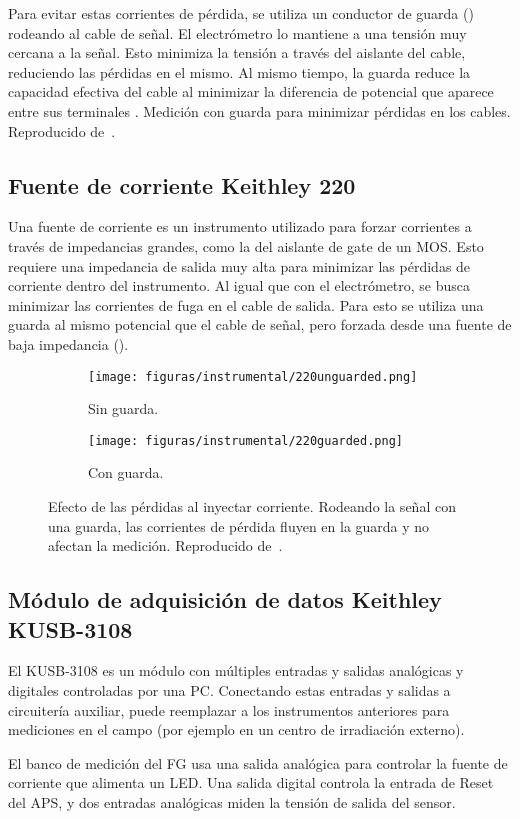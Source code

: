 Para evitar estas corrientes de pérdida,
se utiliza un conductor de guarda ()
rodeando al cable de señal.
El electrómetro lo mantiene a una tensión muy cercana a la señal.
Esto minimiza la tensión a través del aislante del cable,
reduciendo las pérdidas en el mismo.
Al mismo tiempo, la guarda reduce la capacidad efectiva del cable
al minimizar la diferencia de potencial que aparece entre sus terminales
\cite{rich_shielding_1983}.
{Medición con guarda para minimizar pérdidas en los cables.
    Reproducido de~\cite{keithley_instruments_inc._keithley_1984}.}
\subsection{Fuente de corriente Keithley 220}
Una fuente de corriente es un instrumento utilizado para forzar corrientes a
través de impedancias grandes,
como la del aislante de gate de un MOS.
Esto requiere una impedancia de salida muy alta para minimizar las pérdidas de
corriente dentro del instrumento.
Al igual que con el electrómetro,
se busca minimizar las corrientes de fuga en el cable de salida.
Para esto se utiliza una guarda al mismo potencial que el cable de señal,
pero forzada desde una fuente de baja impedancia ().
\begin{figure}[H]
    \begin{subfigure}[b]{\textwidth}
    \centering
        \texttt{[image: figuras/instrumental/220unguarded.png]}
        \caption{Sin guarda.}
    \end{subfigure}
    \begin{subfigure}[b]{\textwidth}
    \centering
        \texttt{[image: figuras/instrumental/220guarded.png]}
        \caption{Con guarda.}
    \end{subfigure}
        \caption{Efecto de las pérdidas al inyectar corriente.
        Rodeando la señal con una guarda, las corrientes de pérdida fluyen en
        la guarda y no afectan la medición.
    Reproducido de~\cite{keithley_instruments_inc._keithley_1984}.}
    \label{fig:220guard}
\end{figure}
\subsection{Módulo de adquisición de datos Keithley KUSB-3108}
El KUSB-3108 es un módulo con múltiples entradas y salidas 
analógicas y digitales controladas por una PC.
Conectando estas entradas y salidas a circuitería auxiliar,
puede reemplazar a los instrumentos anteriores para mediciones en el campo
(por ejemplo en un centro de irradiación externo).

El banco de medición del FG usa una salida analógica 
para controlar la fuente de corriente que alimenta un LED.
Una salida digital controla la entrada de Reset del APS,
y dos entradas analógicas miden la tensión de salida del sensor.
